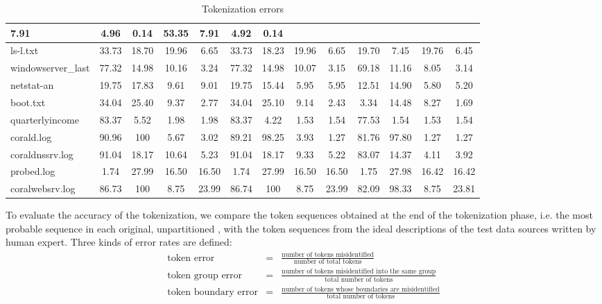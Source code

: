 \begin{table}[th]
\begin{center}
\begin{tabular}{|l||c|c|c|c||c|c|c|c||c|c|c|c|}
7.91
                     & 4.96  & 0.14  & 53.35 & 7.91     & 4.92  & 0.14  \\ \hline
ls-l.txt                   & 33.73 & 18.70 & 19.96 & 6.65  & 33.73 &
               18.23 & 19.96 & 6.65  & 19.70 & 7.45  & 19.76 & 6.45  \\ \hline
windowserver\_last     & 77.32 & 14.98 & 10.16 & 3.24  & 77.32 &
               14.98 & 10.07 & 3.15  & 69.18 & 11.16 & 8.05  & 3.14  \\ \hline
netstat-an                 & 19.75 & 17.83 & 9.61  & 9.01  & 19.75 &
               15.44 & 5.95  & 5.95  & 12.51 & 14.90 & 5.80  & 5.20  \\ \hline
boot.txt                   & 34.04 & 25.40 & 9.37  & 2.77  & 34.04 &
               25.10 & 9.14  & 2.43  & 3.34  & 14.48 & 8.27  & 1.69  \\ \hline
quarterlyincome    & 83.37 & 5.52  & 1.98  & 1.98     & 83.37 &
               4.22  & 1.53  & 1.54     & 77.53 & 1.54  & 1.53  & 1.54     \\ \hline
corald.log            & 90.96 & 100   & 5.67  & 3.02     & 89.21 &
               98.25 & 3.93  & 1.27     & 81.76 & 97.80 & 1.27  & 1.27     \\ \hline
coraldnssrv.log       & 91.04 & 18.17 & 10.64 & 5.23  & 91.04 &
               18.17 & 9.33  & 5.22  & 83.07 & 14.37 & 4.11  & 3.92  \\ \hline
probed.log            & 1.74  & 27.99 & 16.50 & 16.50 & 1.74  &
               27.99 & 16.50 & 16.50 & 1.75  & 27.98 & 16.42 & 16.42 \\ \hline
coralwebsrv.log       & 86.73 & 100   & 8.75  & 23.99 & 86.74 &
               100   & 8.75  & 23.99     & 82.09 & 98.33 & 8.75  & 23.81     \\
               \hline
\end{tabular}
\caption{Tokenization errors}
\label{tab:error}
\end{center}
\end{table}

To evaluate the accuracy of the tokenization,
we compare the token sequences obtained at the end of
the tokenization phase, i.e. the most probable sequence 
in each original, unpartitioned \seqset, 
with the token sequences from the ideal descriptions of the test 
data sources written by human expert. 
Three kinds of error rates are defined:
\begin{eqnarray*}
\textrm{token error} & = & \frac{\textrm{number of tokens misidentified}}
	{\textrm{number of total tokens}} \\
\textrm{token group error} & = & \frac{\textrm{number of tokens misidentified into the same group}}
	{\textrm{total number of tokens}}\\
\textrm{token boundary error} & = & \frac{\textrm{number of tokens whose boundaries are misidentified}}
	{\textrm{total number of tokens}}
\end{eqnarray*}

